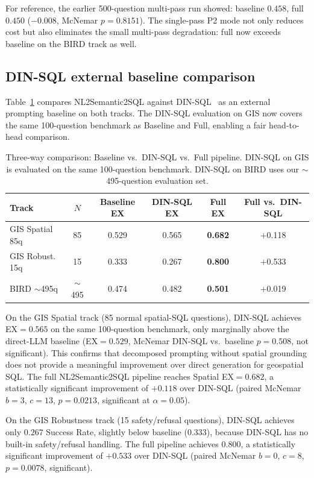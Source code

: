 \documentclass[11pt]{article}
\begin{document}
For reference, the earlier 500-question multi-pass run showed: baseline $0.458$, full $0.450$ ($-0.008$, McNemar $p=0.8151$). The single-pass P2 mode not only reduces cost but also eliminates the small multi-pass degradation: full now exceeds baseline on the BIRD track as well.

\subsection{DIN-SQL external baseline comparison}
\label{sec:dinsql}

Table~\ref{tab:dinsql} compares NL2Semantic2SQL against DIN-SQL~\cite{pourreza2023dinsql} as an external prompting baseline on both tracks. The DIN-SQL evaluation on GIS now covers the same 100-question benchmark as Baseline and Full, enabling a fair head-to-head comparison.

\begin{table}[t]
\centering
\caption{Three-way comparison: Baseline vs.\ DIN-SQL vs.\ Full pipeline. DIN-SQL on GIS is evaluated on the same 100-question benchmark. DIN-SQL on BIRD uses our $\sim$495-question evaluation set.}
\label{tab:dinsql}
\begin{tabular}{lccccc}
\toprule
Track & $N$ & Baseline EX & DIN-SQL EX & Full EX & Full vs.\ DIN-SQL \\
\midrule
GIS Spatial 85q  & 85  & 0.529 & 0.565 & \textbf{0.682} & $+$0.118 \\
GIS Robust. 15q  & 15  & 0.333 & 0.267 & \textbf{0.800} & $+$0.533 \\
BIRD $\sim$495q  & $\sim$495 & 0.474 & 0.482 & \textbf{0.501} & $+$0.019 \\
\bottomrule
\end{tabular}
\end{table}

On the GIS Spatial track (85 normal spatial-SQL questions), DIN-SQL achieves EX$=0.565$ on the same 100-question benchmark, only marginally above the direct-LLM baseline (EX$=0.529$, McNemar DIN-SQL vs.\ baseline $p=0.508$, not significant). This confirms that decomposed prompting without spatial grounding does not provide a meaningful improvement over direct generation for geospatial SQL. The full NL2Semantic2SQL pipeline reaches Spatial EX$=0.682$, a statistically significant improvement of $+0.118$ over DIN-SQL (paired McNemar $b=3$, $c=13$, $p=0.0213$, significant at $\alpha=0.05$).

On the GIS Robustness track (15 safety/refusal questions), DIN-SQL achieves only $0.267$ Success Rate, slightly below baseline ($0.333$), because DIN-SQL has no built-in safety/refusal handling. The full pipeline achieves $0.800$, a statistically significant improvement of $+0.533$ over DIN-SQL (paired McNemar $b=0$, $c=8$, $p=0.0078$, significant).
\end{document}

